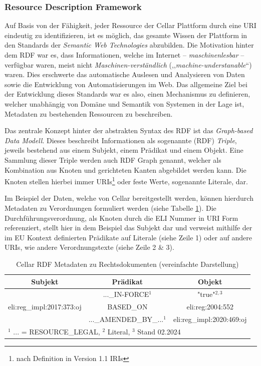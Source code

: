 \subsubsection{Resource Description Framework}

    Auf Basis von der Fähigkeit, jeder Ressource der Cellar Plattform durch eine \ac{URI} eindeutig zu identifizieren, ist es möglich, das gesamte Wissen der Plattform in den Standards der \textit{Semantic Web Technologies} abzubilden.
    Die Motivation hinter dem \acf{RDF} war es, dass Informationen, welche im Internet -- \textit{maschinenlesbar} -- verfügbar waren, meist nicht \textit{Maschinen-verständlich} (,,\textit{machine-understanable}``) waren.
    Dies erschwerte das automatische Auslesen und Analysieren von Daten sowie die Entwicklung von Automatisierungen im Web.
    Das allgemeine Ziel bei der Entwicklung dieses Standards war es also, einen Mechanismus zu definieren, welcher unabhängig von Domäne und Semantik von Systemen in der Lage ist, Metadaten zu bestehenden Ressourcen zu beschreiben. \cite[Abs. 1]{eu_rdf_w3c} 
    
    \medskip
    Das zentrale Konzept hinter der abstrakten Syntax des \ac{RDF} ist das \textit{Graph-based Data Modell}.
    Dieses beschreibt Informationen als sogenannte (\ac{RDF}) \textit{Triple}, jeweils bestehend aus einem Subjekt, einem Prädikat und einem Objekt. 
    Eine Sammlung dieser Triple werden auch \ac{RDF} Graph genannt, welcher als Kombination aus Knoten und gerichteten Kanten abgebildet werden kann.
    Die Knoten stellen hierbei immer \acp{URI}\footnote{nach Definition in Version 1.1 \acp{IRI}} oder feste Werte, sogenannte Literale, dar.
    \cite[Abs. 1.1]{eu_rdf_concepts}

    \medskip
    Im Beispiel der Daten, welche von Cellar bereitgestellt werden, können hierdurch Metadaten zu Verordnungen formuliert werden (siehe Tabelle \ref{tab:rdf_example}).
    Die Durchführungsverordnung, als Knoten durch die \ac{ELI} Nummer in \ac{URI} Form referenziert, stellt hier in dem Beispiel das Subjekt dar und verweist mithilfe der im EU Kontext definierten Prädikate auf Literale (siehe Zeile 1) oder auf andere \acp{URI}, wie andere Verordnungstexte (siehe Zeile 2 \& 3). 
    \begin{table}[h]
        \centering
        \begin{tabular}{|c|c|c|} \hline
             Subjekt&  Prädikat& Objekt\\ \hline\hline
             &  ...\_IN-FORCE$^1$& "true"$^{2,3}$\\ \cline{2-3}
             eli:reg\_impl:2017:373:oj&  BASED\_ON& eli:reg:2004:552\\ \cline{2-3} 
             &  ...\_AMENDED\_BY\_...$^1$& eli:reg\_impl:2020:469:oj\\ \hline
     \multicolumn{3}{l}{\footnotesize $^1$ ... = RESOURCE\_LEGAL, $^2$ Literal, $^3$ Stand 02.2024}\\
        \end{tabular}
        \caption{Cellar RDF Metadaten zu Rechtsdokumenten (vereinfachte Darstellung)}
        \label{tab:rdf_example}
    \end{table}
        
